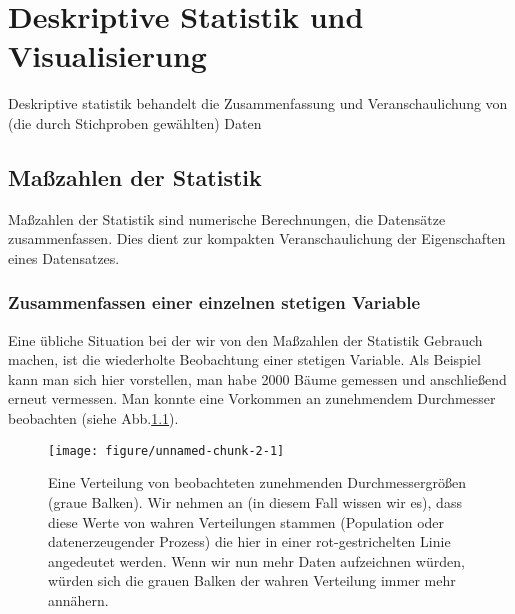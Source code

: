 \documentclass[a4paper,twoside]{tufte-book}\usepackage[]{graphicx}\usepackage[]{color}
\makeatletter
\def\maxwidth{ %
	\ifdim\Gin@nat@width>\linewidth
	\linewidth
	\else
	\Gin@nat@width
	\fi
}
\makeatother
\begin{document}
	
	\chapter{Deskriptive Statistik und Visualisierung}
	
	Deskriptive statistik behandelt die Zusammenfassung und Veranschaulichung von (die durch Stichproben gewählten) Daten
	
	\section{Maßzahlen der Statistik}
	
	Maßzahlen der Statistik sind numerische Berechnungen, die Datensätze zusammenfassen. Dies dient zur kompakten Veranschaulichung der Eigenschaften eines Datensatzes.
	
	\subsection{Zusammenfassen einer einzelnen stetigen Variable}
	
	Eine übliche Situation bei der wir von den Maßzahlen der Statistik Gebrauch machen, ist die wiederholte Beobachtung einer stetigen Variable. Als Beispiel kann man sich hier vorstellen, man habe 2000 Bäume gemessen und anschließend erneut vermessen. Man konnte eine Vorkommen an zunehmendem Durchmesser beobachten (siehe Abb.\ref{fig: data distribution}).

\begin{figure}[htbp]
\begin{center}
\begin{Schunk}

\texttt{[image: figure/unnamed-chunk-2-1]} \end{Schunk}
\caption{Eine Verteilung von beobachteten zunehmenden Durchmessergrößen (graue Balken). Wir nehmen an (in diesem Fall wissen wir es), dass diese Werte von wahren Verteilungen stammen (Population oder datenerzeugender Prozess) die hier in einer rot-gestrichelten Linie angedeutet werden. Wenn wir nun mehr Daten aufzeichnen würden, würden sich die grauen Balken der wahren Verteilung immer mehr annähern.}
\label{fig: data distribution}
\end{center}
\end{figure}
\end{document}
